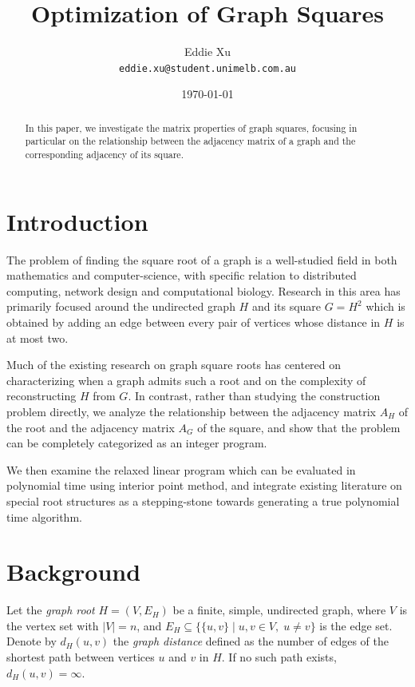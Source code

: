 \documentclass[11pt]{article}
\title{Optimization of Graph Squares}
\author{Eddie Xu\\\small\texttt{eddie.xu@student.unimelb.com.au}}
\date{\today}
\begin{document}
\maketitle

\begin{abstract}
In this paper, we investigate the matrix properties of graph squares, focusing in particular on the
relationship between the adjacency matrix of a graph and the corresponding adjacency of its square. 
\end{abstract}

\tableofcontents

\section{Introduction} \label{sec::intro}

The problem of finding the square root of a graph is a well-studied field in both mathematics and computer-science, with specific relation to distributed computing, network design and computational biology. Research in this area has primarily focused around the undirected graph $H$ and its square $G = H^2$ which is obtained by adding an edge between every pair of vertices whose distance in $H$ is at most two. 

Much of the existing research on graph square roots has centered on characterizing when a graph admits such a root and on the complexity of reconstructing $H$ from $G$. In contrast, rather than studying the construction problem directly, we analyze the relationship between the adjacency matrix $A_H$ of the root and the adjacency matrix $A_G$ of the square, and show that the problem can be completely categorized as an integer program. 

We then examine the relaxed linear program which can be evaluated in polynomial time using interior point method, and integrate existing literature on special root structures as a stepping-stone towards generating a true polynomial time algorithm. 

\section{Background} \label{sec::background}
Let the \emph{graph root} $H = (V, E_H)$ be a finite, simple, undirected graph, where $V$ is the vertex set with $|V| = n$, and $E_H \subseteq \{\{u,v\} \mid u,v \in V,\; u \neq v\}$ is the edge set. Denote by $d_H(u,v)$ the \emph{graph distance} defined as the number of edges of the shortest path between vertices $u$ and $v$ in $H$. If no such path exists, $d_H(u,v) = \infty$.
\end{document}
